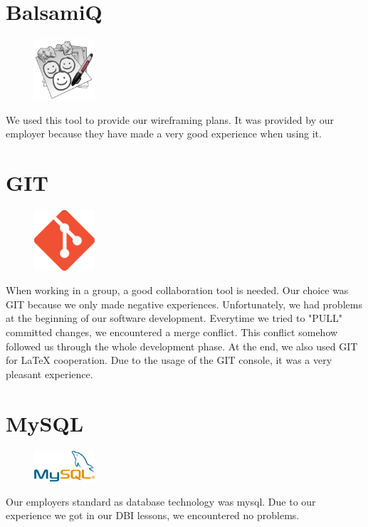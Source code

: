 \section{BalsamiQ}
\begin{figure}
  \begin{center}
    \includegraphics[width=0.2\textwidth] {bilder/balsamiq}
  \end{center}
\end{figure}
We used this tool to provide our wireframing plans. It was provided by our employer because they have made a very good experience when using it.
\section{GIT}
\begin{figure}
  \begin{center}
    \includegraphics[width=0.2\textwidth] {bilder/git}
  \end{center}
\end{figure}
When working in a group, a good collaboration tool is needed. Our choice was GIT because we only made negative experiences.\newline
Unfortunately, we had problems at the beginning of our software development. Everytime we tried to "PULL" committed changes, we encountered a merge conflict. This conflict somehow followed us through the whole development phase.\newline
At the end, we also used GIT for LaTeX cooperation. Due to the usage of the GIT console, it was a very pleasant experience.
\section{MySQL}
\begin{figure}
  \begin{center}
    \includegraphics[width=0.2\textwidth] {bilder/MySQL}
  \end{center}
\end{figure}
Our employers standard as database technology was \gls{mysql}. Due to our experience we got in our DBI lessons, we encountered no problems.
